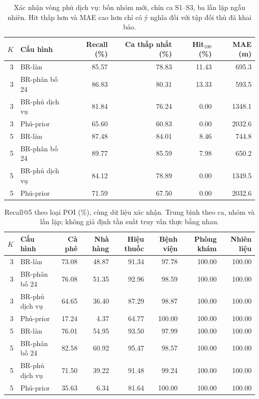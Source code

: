 \begin{table}[htbp]
\centering\small
\caption{Xác nhận vòng phủ dịch vụ: bốn nhóm mới, chín ca S1--S3, ba lần lặp ngẫu nhiên. Hit thấp hơn và MAE cao hơn chỉ có ý nghĩa đối với tập đối thủ đã khai báo.}
\label{tab:service-cover-main}
\setlength{\tabcolsep}{4pt}
\begin{tabular}{rlrrrr}
\toprule
$K$ & Cấu hình & Recall (\%) & Ca thấp nhất (\%) & Hit$_{100}$ (\%) & MAE (m) \\
\midrule
3 & BR-làn & 85.57 & 78.83 & 11.43 & 695.3 \\
3 & BR-phân bố 24 & 86.83 & 80.31 & 13.33 & 593.5 \\
3 & BR-phủ dịch vụ & 81.84 & 76.24 & 0.00 & 1348.1 \\
3 & Phủ-prior & 65.60 & 60.83 & 0.00 & 2032.6 \\
5 & BR-làn & 87.48 & 84.01 & 8.46 & 744.8 \\
5 & BR-phân bố 24 & 89.77 & 85.59 & 7.98 & 650.2 \\
5 & BR-phủ dịch vụ & 84.12 & 78.89 & 0.00 & 1349.5 \\
5 & Phủ-prior & 71.59 & 67.50 & 0.00 & 2032.6 \\
\bottomrule
\end{tabular}
\end{table}
\begin{table}[htbp]
\centering\footnotesize
\caption{Recall@5 theo loại POI (\%), cùng dữ liệu xác nhận. Trung bình theo ca, nhóm và lần lặp; không giả định tần suất truy vấn thực bằng nhau.}
\label{tab:service-cover-categories}
\setlength{\tabcolsep}{3pt}
\begin{tabular}{rlrrrrrr}
\toprule
$K$ & Cấu hình & Cà phê & Nhà hàng & Hiệu thuốc & Bệnh viện & Phòng khám & Nhiên liệu \\
\midrule
3 & BR-làn & 73.08 & 48.87 & 91.34 & 97.78 & 100.00 & 100.00 \\
3 & BR-phân bố 24 & 76.08 & 51.35 & 92.96 & 98.59 & 100.00 & 100.00 \\
3 & BR-phủ dịch vụ & 64.65 & 36.40 & 87.29 & 98.87 & 100.00 & 100.00 \\
3 & Phủ-prior & 17.24 & 4.37 & 64.77 & 100.00 & 100.00 & 100.00 \\
5 & BR-làn & 76.01 & 54.95 & 93.50 & 97.99 & 100.00 & 100.00 \\
5 & BR-phân bố 24 & 82.58 & 60.92 & 95.47 & 98.57 & 100.00 & 100.00 \\
5 & BR-phủ dịch vụ & 71.50 & 39.22 & 91.48 & 99.24 & 100.00 & 100.00 \\
5 & Phủ-prior & 35.63 & 6.34 & 81.64 & 100.00 & 100.00 & 100.00 \\
\bottomrule
\end{tabular}
\end{table}

